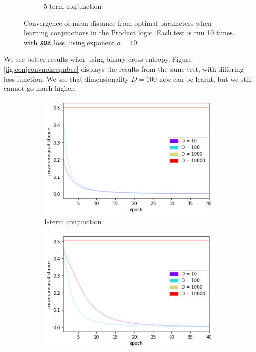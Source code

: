 \begin{figure}[h]
\begin{subfigure}[b]{0.48\textwidth}
        \caption{5-term conjunction}
        \label{fig:conjconvnokeepn5}
    \end{subfigure}
       \caption{Convergence of mean distance from optimal parameters when learning conjunctions in the Product logic. Each test is run 10 times, with $\texttt{XOR}$ loss, using exponent $a=10$.}
       \label{fig:conjconvnokeepn}
\end{figure}

We see better results when using binary cross-entropy. Figure \ref{fig:conjconvnokeepnbce} displays the results from the same test, with differing loss function. We see that dimensionality $D=100$ now can be learnt, but we still cannot go much higher.

\begin{figure}[h]
    \centering
    \begin{subfigure}[b]{0.48\textwidth}
        \centering
        \includegraphics[width=\textwidth]{imgs/conj-pmd-prod-nokeepn-1t-bce.png}
        \caption{1-term conjunction}
        \label{fig:conjconvnokeepn1bce}
    \end{subfigure}
    \begin{subfigure}[b]{0.48\textwidth}
        \centering
        \includegraphics[width=\textwidth]{imgs/conj-pmd-prod-nokeepn-5t-bce.png}

\end{subfigure}
\end{figure}
